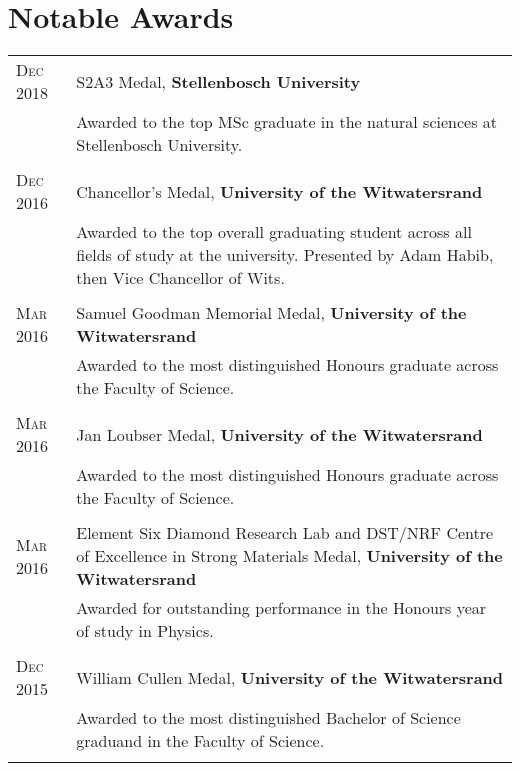 \section{Notable Awards}

\begin{supertabular}{p{1.8cm}|p{12cm}}
	\textsc{Dec 2018} & S2A3 Medal, \textbf{Stellenbosch University} \\
	& \small{Awarded to the top MSc graduate in the natural sciences at Stellenbosch University.} \\
	 \\
	\textsc{Dec 2016} & Chancellor's Medal, \textbf{University of the Witwatersrand} \\
	& \small{Awarded to the top overall graduating student across all fields of study at the university. Presented by Adam Habib, then Vice Chancellor of Wits.} \\
	 \\
	\textsc{Mar 2016} & Samuel Goodman Memorial Medal, \textbf{University of the Witwatersrand} \\
	& \small{Awarded to the most distinguished Honours graduate across the Faculty of Science.} \\
	 \\
	\textsc{Mar 2016} & Jan Loubser Medal, \textbf{University of the Witwatersrand} \\
	& \small{Awarded to the most distinguished Honours graduate across the Faculty of Science.} \\
	 \\
	\textsc{Mar 2016} & Element Six Diamond Research Lab and DST/NRF Centre of Excellence in Strong Materials Medal, \textbf{University of the Witwatersrand} \\
	& \small{Awarded for outstanding performance in the Honours year of study in Physics.} \\
	 \\
	\textsc{Dec 2015} & William Cullen Medal, \textbf{University of the Witwatersrand} \\
	& \small{Awarded to the most distinguished Bachelor of Science graduand in the Faculty of Science.} \\
	 \\
\end{supertabular}
